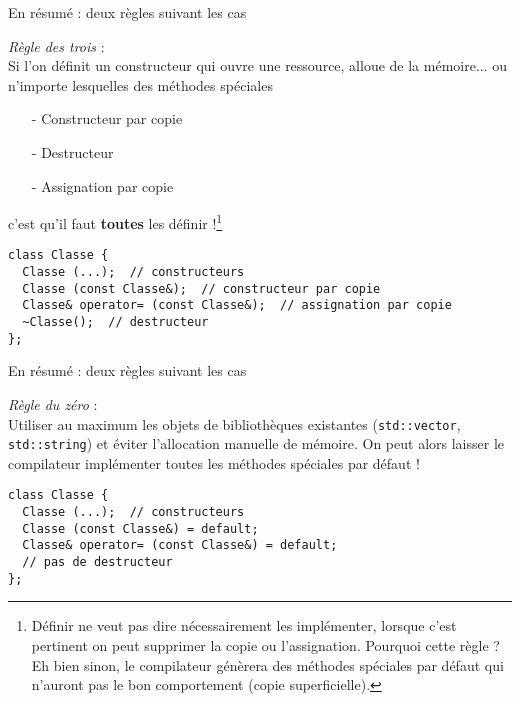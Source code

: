 \documentclass[c]{beamer}
\newcommand{\inline}[1]{\texttt{#1}}
\begin{document}

\begin{frame}[fragile]{En résumé : deux règles suivant les cas}

\emph{Règle des trois} :\\[0.5em]
Si l'on définit un constructeur qui ouvre une ressource, alloue de la mémoire... ou n'importe lesquelles des méthodes spéciales
\begin{itemize}
  \item[-] Constructeur par copie
  \item[-] Destructeur
  \item[-] Assignation par copie
\end{itemize}
\pause
c'est qu'il faut \textbf{toutes} les définir !\footnote{Définir ne veut pas dire nécessairement les implémenter, lorsque c'est pertinent on peut supprimer la copie ou l'assignation. Pourquoi cette règle ? Eh bien sinon, le compilateur génèrera des méthodes spéciales par défaut qui n'auront pas le bon comportement (copie superficielle).}
\vspace{1em}

\begin{verbatim}
class Classe {
  Classe (...);  // constructeurs
  Classe (const Classe&);  // constructeur par copie
  Classe& operator= (const Classe&);  // assignation par copie
  ~Classe();  // destructeur
};
\end{verbatim}

\end{frame}


\begin{frame}[fragile]{En résumé : deux règles suivant les cas}

\emph{Règle du zéro} :\\[0.5em]
Utiliser au maximum les objets de bibliothèques existantes (\inline{std::vector}, \inline{std::string}) et éviter l'allocation manuelle de mémoire. On peut alors laisser le compilateur implémenter toutes les méthodes spéciales par défaut !
\vspace{1em}

\begin{verbatim}
class Classe {
  Classe (...);  // constructeurs
  Classe (const Classe&) = default;
  Classe& operator= (const Classe&) = default;
  // pas de destructeur
};
\end{verbatim}

\end{frame}
\end{document}
